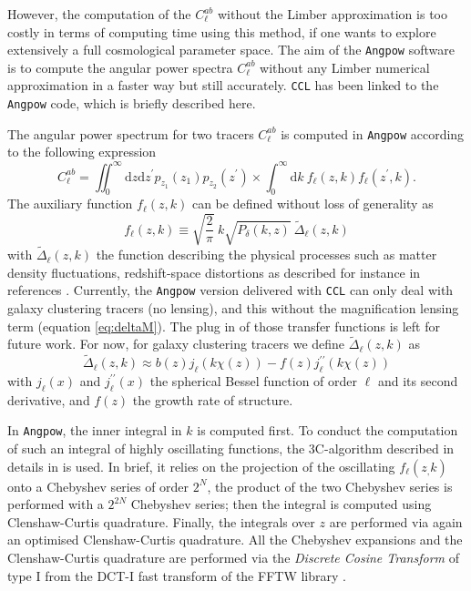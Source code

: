 \documentclass[\docopts]{\docclass}
\newcommand{\ccl}{{\tt CCL}\xspace}
\begin{document}
However, the computation of the $C^{ab}_\ell$ without the Limber approximation is too costly in terms of computing time using this method, if one wants to explore extensively a full cosmological parameter space. The aim of the \texttt{Angpow} software \citep{2017A&A...602A..72C} is to compute the angular power spectra  $C_{\ell}^{ab}$  without any Limber numerical approximation in a faster way but still accurately. \ccl has been linked to the \texttt{Angpow} code,  which is briefly described here.

The angular power spectrum for two tracers $C_{\ell}^{ab}$ is computed in \texttt{Angpow} according to the following expression
\begin{equation}
  C_{\ell}^{ab} = \iint_0^\infty \mathrm{d} z \mathrm{d} z^\prime  p_{z_1}(z_1) p_{z_2}(z^\prime) \times \int_0^\infty \mathrm{d} k\ f_{\ell}(z, k) f_{\ell}(z^\prime, k).
  \label{eq-clz1z2-obs}
\end{equation}
The auxiliary function $f_\ell(z,k)$ can be defined without loss of generality as
\begin{equation}
f_\ell(z,k) \equiv  \sqrt{\frac{2}{\pi}}\  k \sqrt{P_\delta(k,z)}\ \widetilde{\Delta}_\ell(z,k)\label{eq-fell-func}
\end{equation}
with $\widetilde{\Delta}_\ell(z,k)$ the function describing the physical processes such as matter density fluctuations, redshift-space distortions as described for instance in references \citet{2008cmb..book.....D,2009PhRvD..80h3514Y,2010PhRvD..82h3508Y, 2011PhRvD..84d3516C,2011PhRvD..84f3505B}. Currently, the \texttt{Angpow} version delivered with \ccl can only deal with galaxy clustering tracers (no lensing), and this without the magnification lensing term (equation \ref{eq:deltaM}). The plug in of those transfer functions is left for future work. For now, for galaxy clustering tracers we define $\widetilde{\Delta}_\ell(z,k)$ as 
\begin{equation}
 \widetilde{\Delta}_\ell(z,k) \approx b(z) j_\ell(k \chi(z)) - f(z) j_\ell^{\prime\prime}(k \chi(z)) 
\end{equation}
with $j_\ell(x)$ and $j_\ell^{\prime\prime}(x)$ the spherical Bessel function of order $\ell$ and its second derivative, and $f(z)$ the growth rate of structure.

In \texttt{Angpow}, the inner integral in $k$ is computed first. 
To conduct the computation of such an integral of highly oscillating functions, the 3C-algorithm described in details in \citep{2017A&A...602A..72C} is used. In brief, it relies on the projection of the oscillating $f_\ell(z_,k)$ onto a Chebyshev series of order $2^N$, the product of the two Chebyshev series is performed with a $2^{2N}$ Chebyshev series; then the integral is computed using Clenshaw-Curtis quadrature. Finally, the integrals over $z$ are performed via again an optimised Clenshaw-Curtis quadrature. All the Chebyshev expansions and the Clenshaw-Curtis quadrature are performed via the \textit{Discrete Cosine Transform} of type I from the DCT-I fast transform of the FFTW library \citep{FFTW}.
\end{document}
